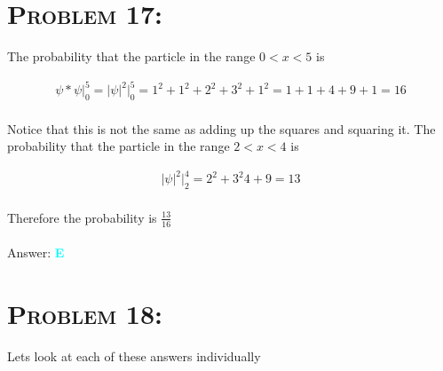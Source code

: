 \documentclass{article}
\begin{document}

\section{\textsc{Problem 17:}} The probability that the particle in the range $0 < x < 5$ is

\begin{gather}
{\psi * \psi}\biggr\rvert_{0}^{5} = { | \psi |^{2}}\biggr\rvert_{0}^{5} = 1^{2} + 1^{2} + 2^{2} + 3^{2} + 1^{2} = 1+1 +4 + 9 + 1 = 16\nonumber
\end{gather}
\\
Notice that this is not the same as adding up the squares and squaring it. The probability that the particle in the range $2 < x < 4$ is

\begin{gather}
{ | \psi |^{2}}\biggr\rvert_{2}^{4} =  2^{2} + 3^{2} 4 + 9 = 13\nonumber
\end{gather}
\\
Therefore the probability is $\boxed{\frac{13}{16}}$
\\\\
Answer: \textbf{\textcolor{cyan}E}\\


\section{\textsc{Problem 18:}} Lets look at each of these answers individually
\end{document}
